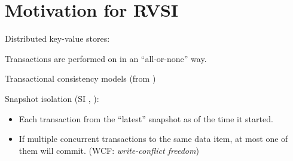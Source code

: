 \section{Motivation for RVSI}

\begin{frame}{}
  \centerline{Distributed key-value stores:}
  \centerline{\putop{} \qquad \getop{}}
\end{frame}

\begin{frame}{}
  \begin{center}
    Transactions are performed on  in an ``all-or-none'' way.
  \end{center}

  \pause
  \vspace{0.50cm}
  \centerline{Transactional consistency models (from )}
\end{frame}

\begin{frame}{}
  Snapshot isolation (SI , ):
  \begin{itemize}
    \item Each transaction  from the ``latest'' snapshot as of the time it started.
    \item If multiple concurrent transactions  to the same data item,
      at most one of them will commit. \hfill (WCF: \emph{write-conflict freedom})
  \end{itemize}
\end{frame}

